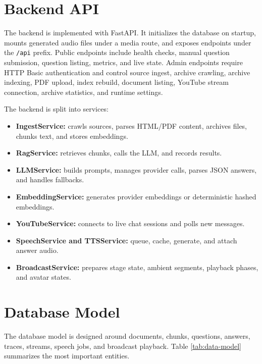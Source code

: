 \section{Backend API}

The backend is implemented with FastAPI. It initializes the database on startup, mounts generated audio files under a media route, and exposes endpoints under the \texttt{/api} prefix. Public endpoints include health checks, manual question submission, question listing, metrics, and live state. Admin endpoints require HTTP Basic authentication and control source ingest, archive crawling, archive indexing, PDF upload, index rebuild, document listing, YouTube stream connection, archive statistics, and runtime settings.

The backend is split into services:

\begin{itemize}
    \item \textbf{IngestService:} crawls sources, parses HTML/PDF content, archives files, chunks text, and stores embeddings.
    \item \textbf{RagService:} retrieves chunks, calls the LLM, and records results.
    \item \textbf{LLMService:} builds prompts, manages provider calls, parses JSON answers, and handles fallbacks.
    \item \textbf{EmbeddingService:} generates provider embeddings or deterministic hashed embeddings.
    \item \textbf{YouTubeService:} connects to live chat sessions and polls new messages.
    \item \textbf{SpeechService and TTSService:} queue, cache, generate, and attach answer audio.
    \item \textbf{BroadcastService:} prepares stage state, ambient segments, playback phases, and avatar states.
\end{itemize}

\section{Database Model}

The database model is designed around documents, chunks, questions, answers, traces, streams, speech jobs, and broadcast playback. Table \ref{tab:data-model} summarizes the most important entities.

